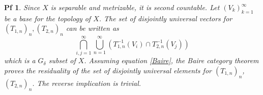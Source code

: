 \documentclass[10pt,a4paper]{amsart}
\newtheorem{pf}{Pf}
\begin{document}
\begin{pf}
    Since $X$ is separable and metrizable, it is second countable. Let $(V_k)_{k=1}^{\infty}$ be a base for the topology of $X$. The set of disjointly universal vectors for $(T_{1,n})_n, (T_{2,n})_n$  can be written as
    $$
    \bigcap_{i,j=1}^{\infty}\bigcup_{n=1}^{\infty}( T^{-1}_{1,n} (V_i) \cap T^{-1}_{2,n} (V_j))
    $$
    which is a $G_{\delta}$ subset of $X$. Assuming equation \ref{Baire}, the Baire category theorem proves the residuality of the set of disjointly universal elements for $(T_{1,n})_n$, $(T_{2,n})_n$. The reverse implication is trivial.
    \end{pf}
\end{document}
